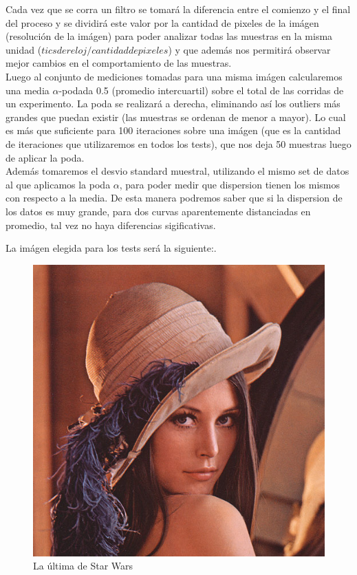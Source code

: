 Cada vez que se corra un filtro se tomará la diferencia entre el comienzo y el final del proceso y se dividirá este valor por la cantidad de pixeles de la imágen (resolución de la imágen) para poder analizar todas las muestras en la misma unidad ($tics de reloj /cantidad de pixeles$) y que además nos permitirá observar mejor cambios en el comportamiento de las muestras.\\

Luego al conjunto de mediciones tomadas para una misma imágen calcularemos una media $\alpha$-podada 0.5 (promedio intercuartil) sobre el total de las corridas de un experimento. La poda se realizará a derecha, eliminando así los outliers más grandes que puedan existir (las muestras se ordenan de menor a mayor). Lo cual es más que suficiente para 100 iteraciones sobre una imágen (que es la cantidad de iteraciones que utilizaremos en todos los tests), que nos deja 50 muestras luego de aplicar la poda. \\ 
Además tomaremos el desvio standard muestral, utilizando el mismo set de datos al que aplicamos la poda $\alpha$, para poder medir que dispersion tienen los mismos con respecto a la media. 
De esta manera podremos saber que si la dispersion de los datos es muy grande, para dos curvas aparentemente distanciadas en promedio, tal vez no haya diferencias sigificativas.

La imágen elegida para los tests será la siguiente:.

\newpage

\begin{figure}
  \begin{center}
	\includegraphics[scale=.5]{imagenes/lena32.jpg}
	\caption{La última de Star Wars}
	\label{lena}
  \end{center}
\end{figure}

